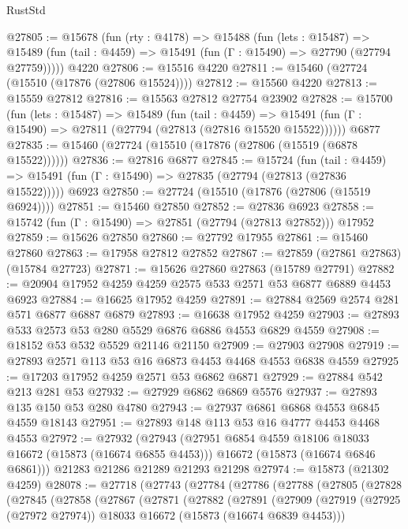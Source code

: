 \begin{lexlean}{RustStd}
\begin{coremodule}
@27805 := @15678
    (fun (rty : @4178) =>
    @15488
      (fun (lets : @15487) =>
      @15489 (fun (tail : @4459) => @15491 (fun (Γ : @15490) => @27790 (@27794 @27759)))))
    @4220
@27806 := @15516 @4220
@27811 := @15460 (@27724 (@15510 (@17876 (@27806 @15524))))
@27812 := @15560 @4220
@27813 := @15559 @27812
@27816 := @15563 @27812 @27754 @23902
@27828 := @15700
    (fun (lets : @15487) =>
    @15489
      (fun (tail : @4459) =>
      @15491 (fun (Γ : @15490) => @27811 (@27794 (@27813 (@27816 @15520 @15522))))))
    @6877
@27835 := @15460 (@27724 (@15510 (@17876 (@27806 (@15519 (@6878 @15522))))))
@27836 := @27816 @6877
@27845 := @15724
    (fun (tail : @4459) => @15491 (fun (Γ : @15490) => @27835 (@27794 (@27813 (@27836 @15522)))))
    @6923
@27850 := @27724 (@15510 (@17876 (@27806 (@15519 @6924))))
@27851 := @15460 @27850
@27852 := @27836 @6923
@27858 := @15742 (fun (Γ : @15490) => @27851 (@27794 (@27813 @27852))) @17952
@27859 := @15626 @27850
@27860 := @27792 @17955
@27861 := @15460 @27860
@27863 := @17958 @27812 @27852
@27867 := @27859 (@27861 @27863) (@15784 @27723)
@27871 := @15626 @27860 @27863 (@15789 @27791)
@27882 := @20904 @17952 @4259 @4259 @2575 @533 @2571 @53 @6877 @6889 @4453 @6923
@27884 := @16625 @17952 @4259
@27891 := @27884 @2569 @2574 @281 @571 @6877 @6887 @6879
@27893 := @16638 @17952 @4259
@27903 := @27893 @533 @2573 @53 @280 @5529 @6876 @6886 @4553 @6829 @4559
@27908 := @18152 @53 @532 @5529 @21146 @21150
@27909 := @27903 @27908
@27919 := @27893 @2571 @113 @53 @16 @6873 @4453 @4468 @4553 @6838 @4559
@27925 := @17203 @17952 @4259 @2571 @53 @6862 @6871
@27929 := @27884 @542 @213 @281 @53
@27932 := @27929 @6862 @6869 @5576
@27937 := @27893 @135 @150 @53 @280 @4780
@27943 := @27937 @6861 @6868 @4553 @6845 @4559 @18143
@27951 := @27893 @148 @113 @53 @16 @4777 @4453 @4468 @4553
@27972 := @27932
    (@27943
      (@27951 @6854 @4559 @18106 @18033 @16672 (@15873 (@16674 @6855 @4453)))
      @16672
      (@15873 (@16674 @6846 @6861)))
    @21283
    @21286
    @21289
    @21293
    @21298
@27974 := @15873 (@21302 @4259)
@28078 := @27718
    (@27743
      (@27784
        (@27786
          (@27788
            (@27805
              (@27828
                (@27845
                  (@27858
                    (@27867
                      (@27871
                        (@27882
                          (@27891
                            (@27909
                              (@27919
                                (@27925 (@27972 @27974))
                                @18033
                                @16672
                                (@15873 (@16674 @6839 @4453)))

\end{coremodule}
\end{lexlean}
